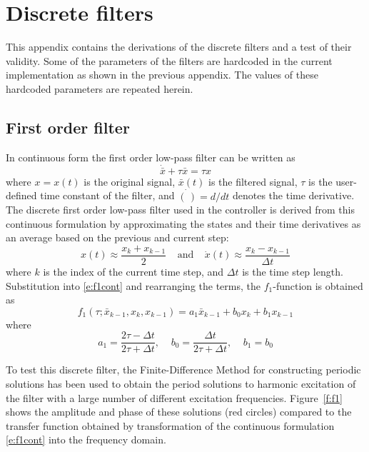\appendix

\chapter{Discrete filters} \label{ch:filters}

This appendix contains the derivations of the discrete filters and a test of their validity. Some of the parameters of the filters are hardcoded in the current implementation as shown in the previous appendix. The values of these hardcoded parameters are repeated herein.

\section{First order filter}

In continuous form the first order low-pass filter can be written as
\begin{equation}\label{e:f1cont}
\dot{\bar x} + \tau \bar x = \tau x
\end{equation}
where $x=x(t)$ is the original signal, $\bar x(t)$ is the filtered signal, $\tau$ is the user-defined time constant of the filter, and $\dot{(\,)}=d/dt$ denotes the time derivative. The discrete first order low-pass filter used in the controller is derived from this continuous formulation by approximating the states and their time derivatives as an average based on the previous and current step:
\begin{equation}\label{e:1storder}
x(t)\approx \frac{x_k+x_{k-1}}2 \;\;\;\;\mbox{and} \;\;\;\;\dot x(t)\approx \frac{x_k-x_{k-1}}{\Delta t}
\end{equation}
where $k$ is the index of the current time step, and $\Delta t$ is the time step length. Substitution into \eqref{e:f1cont} and rearranging the terms, the $f_1$-function is obtained as
\begin{equation}
\label{e:f1}
f_1 \left(\tau; \bar x_{k-1} , x_{k} , x_{k-1} \right) = a_1 \bar x_{k-1} + b_0 x_k + b_1 x_{k-1}
\end{equation}
where
\begin{equation}
\label{e:f1coef}
a_1=\frac {2\tau-\Delta t}{2\tau+\Delta t} , \;\;\;\; b_0 = \frac {\Delta t}{2\tau+\Delta t}, \;\;\;\; b_1 = b_0
\end{equation}

To test this discrete filter, the Finite-Difference Method for constructing periodic solutions \cite{Nayfeh95} has been used to obtain the period solutions to harmonic excitation of the filter with a large number of different excitation frequencies. Figure~\ref{f:f1} shows the amplitude and phase of these solutions (red circles) compared to the transfer function obtained by transformation of the continuous formulation \eqref{e:f1cont} into the frequency domain.

